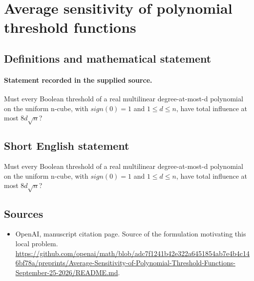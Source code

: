 \documentclass[11pt]{article}
\begin{document}
\section*{Average sensitivity of polynomial threshold functions}\label{30007477}
\subsection{Definitions and mathematical statement}
\paragraph{Statement recorded in the supplied source.}
Must every Boolean threshold of a real multilinear degree-at-most-d polynomial on the uniform n-cube, with $sign(0)=1$ and $1\leq d\leq n$, have total influence at most $8d\surd n$?
\subsection{Short English statement}
Must every Boolean threshold of a real multilinear degree-at-most-d polynomial on the uniform n-cube, with $sign(0)=1$ and $1\leq d\leq n$, have total influence at most $8d\surd n$?
\subsection{Sources}
\begin{itemize}
\item[S1] OpenAI, manuscript citation page. Source of the formulation motivating this local problem.
\url{https://github.com/openai/math/blob/adc7f1241b42e322a6451854ab7e4b4c146bf78a/preprints/Average-Sensitivity-of-Polynomial-Threshold-Functions-September-25-2026/README.md}.
\end{itemize}
\end{document}
